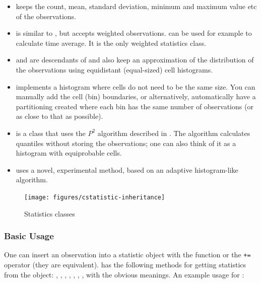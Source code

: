 \begin{itemize}
  \item{ keeps the count, mean, standard
    deviation, minimum and maximum value etc of the observations.}
  \item{ is similar to , but
    accepts weighted observations.  can be used
    for example to calculate time average. It is the only weighted
    statistics class.}
  \item{ and  are
    descendants of  and also keep an approximation of
    the distribution of the observations using equidistant
    (equal-sized) cell histograms.}
  \item{ implements a histogram where cells do not
    need to be the same size. You can manually add the cell (bin)
    boundaries, or alternatively, automatically have a partitioning
    created where each bin has the same number of observations (or as
    close to that as possible).}
  \item{ is a class that uses the $P^{2}$ algorithm
    described in \cite{JCh85}. The algorithm calculates quantiles without
    storing the observations; one can also think of it as a histogram
    with equiprobable cells.}
  \item{ uses a novel, experimental method, based on an
    adaptive histogram-like algorithm.}
\end{itemize}

\begin{figure}[htbp]
  \begin{center}
    \texttt{[image: figures/cstatistic-inheritance]}
    \caption{Statistics classes}
  \end{center}
\end{figure}

\subsubsection{Basic Usage}

One can insert an observation into a statistic object with the
 function or the \texttt{+=} operator (they are
equivalent).   has the following methods for getting
statistics from the object: , ,
, , , ,
,  with the obvious meanings. An example
usage for :

